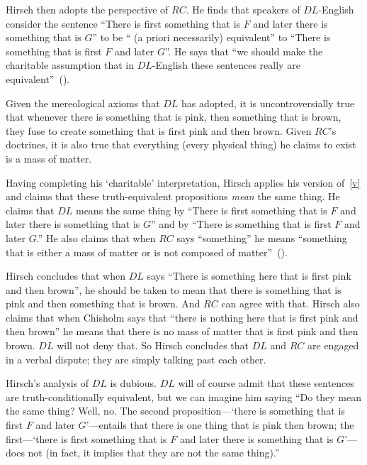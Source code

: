 \documentclass[11pt]{article}
\begin{document}
\begin{spacing}{1.25}
Hirsch then adopts the perspective of $RC$.  He finds that speakers of
$DL$-English consider the sentence ``There is first something that is
$F$ and later there is something that is $G$'' to be `` (a priori
necessarily) equivalent'' to ``There is something that is first $F$
and later $G$''.  He says that ``we should make the charitable
assumption that in $DL$-English these sentences really are
equivalent''~(\citeyear[78]{hirsch2005}).

Given the mereological axioms that $DL$ has adopted, it is
uncontroversially true that whenever there is something that is pink,
then something that is brown, they fuse to create something that is
first pink and then brown.  Given $RC$'s doctrines, it is also
true that everything (every physical thing) he claims to exist is a
mass of matter.

Having completing his `charitable' interpretation, Hirsch applies his
version of~\ref{v} and claims that these truth-equivalent propositions
{\em mean} the same thing.  He claims that $DL$ means the same thing
by ``There is first something that is $F$ and later there is something
that is $G$'' and by ``There is something that is first $F$ and later
$G$.''  He also claims that when $RC$ says ``something'' he means
``something that is either a mass of matter or is not composed of
matter''~(\citeyear[76]{hirsch2005}).

Hirsch concludes that when $DL$ says ``There is something here that is
first pink and then brown'', he should be taken to mean that there is
something that is pink and then something that is brown.  And $RC$ can
agree with that.  Hirsch also claims that when Chisholm says that
``there is nothing here that is first pink and then brown'' he means
that there is no mass of matter that is first pink and then
brown.  $DL$ will not deny that.  So Hirsch concludes that $DL$ and
$RC$ are engaged in a verbal dispute; they are simply talking past
each other.

Hirsch's analysis of $DL$ is dubious.  $DL$ will of course admit that
these sentences are truth-conditionally equivalent, but we can imagine
him saying ``Do they mean the same thing?  Well, no.  The second
proposition---`there is something that is first $F$ and later
$G$'---entails that there is one thing that is pink then brown; the
first---`there is first something that is $F$ and later there is
something that is $G$'---does not (in fact, it implies that they are
not the same thing).''


\end{spacing}
\end{document}
